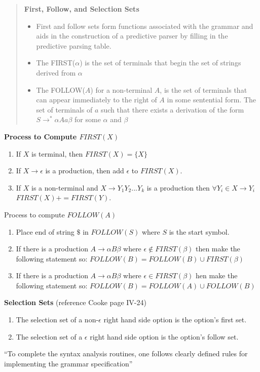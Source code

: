 \documentclass[11pt]{article}
\begin{document}
\begin{quote}
\textbf {First, Follow, and Selection Sets}
\begin{itemize}
\item First and follow sets form functions associated with the grammar and aids in the construction of a predictive parser by filling in the predictive parsing table.  
\item The FIRST($\alpha$) is the set of terminals that begin the set of strings derived from $\alpha$ 
\item The FOLLOW($A$) for a non-terminal $A$, is the set of terminals that can appear immediately to the right of $A$ in some sentential form.  The set of terminals of $a$ such that there exists a derivation of the form $S \to^* \alpha A a \beta$ for some $\alpha$ and $\beta$
\end{itemize}
\end{quote}

\textbf {Process to Compute $FIRST(X)$}
\begin{enumerate}
\item If $X$ is terminal, then $FIRST(X) = \{ X \}$
\item If $X\to \epsilon $ is a production, then add $\epsilon$ to $FIRST(X)$.
\item If $X$ is a non-terminal and $X\to Y_1 Y_2 ... Y_k$ is a production then $\forall Y_i \in X\to Y_i$ $FIRST(X) += FIRST(Y)$.  
\end{enumerate}

Process to compute $FOLLOW(A)$
\begin{enumerate}
\item Place end of string $\$ $ in $FOLLOW (S)$ where $S$ is the start symbol.
\item If there is a production $A\to \alpha B \beta$ where $\epsilon \notin FIRST(\beta)$ then make the following statement so: $FOLLOW(B) = FOLLOW(B) \cup FIRST(\beta) $
\item If there is a production $A\to \alpha B \beta$ where $\epsilon \in FIRST(\beta)$ hen make the following statement so: $FOLLOW(B) = FOLLOW(A) \cup FOLLOW(B) $
\end{enumerate}

\textbf {Selection Sets } (reference Cooke page IV-24)
\begin{enumerate}
\item The selection set of a non-$\epsilon$ right hand side option is the option's first set.
\item The selection set of a $\epsilon$ right hand side option is the option's follow set.
\end{enumerate}
``To complete the syntax analysis routines, one follows clearly defined rules for implementing the grammar specification''
\end{document}
